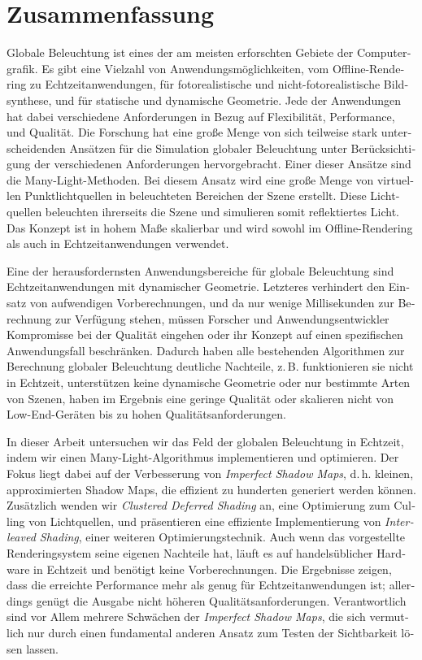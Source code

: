 \chapter*{Zusammenfassung}

\begin{otherlanguage}{ngerman}

Globale Beleuchtung ist eines der am meisten erforschten Gebiete der Computergrafik. Es gibt eine Vielzahl von Anwendungsmöglichkeiten, vom Offline-Rendering zu Echtzeitanwendungen, für fotorealistische und nicht-fotorealistische Bildsynthese, und für statische und dynamische Geometrie. Jede der Anwendungen hat dabei verschiedene Anforderungen in Bezug auf Flexibilität, Performance, und Qualität. Die Forschung hat eine große Menge von sich teilweise stark unterscheidenden Ansätzen für die Simulation globaler Beleuchtung unter Berücksichtigung der verschiedenen Anforderungen hervorgebracht. Einer dieser Ansätze sind die Many-Light-Methoden. Bei diesem Ansatz wird eine große Menge von virtuellen Punktlichtquellen in beleuchteten Bereichen der Szene erstellt. Diese Lichtquellen beleuchten ihrerseits die Szene und simulieren somit reflektiertes Licht. Das Konzept ist in hohem Maße skalierbar und wird sowohl im Offline-Rendering als auch in Echtzeitanwendungen verwendet.

Eine der herausfordernsten Anwendungsbereiche für globale Beleuchtung sind Echtzeitanwendungen mit dynamischer Geometrie. Letzteres verhindert den Einsatz von aufwendigen Vorberechnungen, und da nur wenige Millisekunden zur Berechnung zur Verfügung stehen, müssen Forscher und Anwendungsentwickler Kompromisse bei der Qualität eingehen oder ihr Konzept auf einen spezifischen Anwendungsfall beschränken. Dadurch haben alle bestehenden Algorithmen zur Berechnung globaler Beleuchtung deutliche Nachteile, z.\,B. funktionieren sie nicht in Echtzeit, unterstützen keine dynamische Geometrie oder nur bestimmte Arten von Szenen, haben im Ergebnis eine geringe Qualität oder skalieren nicht von Low-End-Geräten bis zu hohen Qualitätsanforderungen.

In dieser Arbeit untersuchen wir das Feld der globalen Beleuchtung in Echtzeit, indem wir einen Many-Light-Algorithmus implementieren und optimieren. Der Fokus liegt dabei auf der Verbesserung von \textit{Imperfect Shadow Maps}, d.\,h. kleinen, approximierten Shadow Maps, die effizient zu hunderten generiert werden können. Zusätzlich wenden wir \textit{Clustered Deferred Shading} an, eine Optimierung zum Culling von Lichtquellen, und präsentieren eine effiziente Implementierung von \textit{Interleaved Shading}, einer weiteren Optimierungstechnik. Auch wenn das vorgestellte Renderingsystem seine eigenen Nachteile hat, läuft es auf handelsüblicher Hardware in Echtzeit und benötigt keine Vorberechnungen. Die Ergebnisse zeigen, dass die erreichte Performance mehr als genug für Echtzeitanwendungen ist; allerdings genügt die Ausgabe nicht höheren Qualitätsanforderungen. Verantwortlich sind vor Allem mehrere Schwächen der \textit{Imperfect Shadow Maps}, die sich vermutlich nur durch einen fundamental anderen Ansatz zum Testen der Sichtbarkeit lösen lassen.

\end{otherlanguage}

\cleardoublepage
